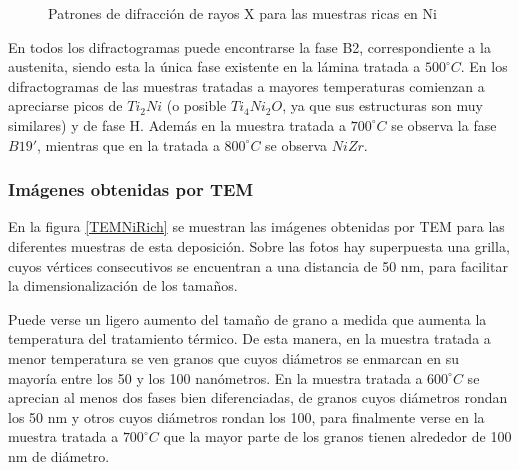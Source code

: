 \documentclass[12pt]{article}
\theoremstyle{definition}
\theoremstyle{remark}
\begin{document}
{\begin{figure}[H]
\caption{Patrones de difracción de rayos X para las muestras ricas en Ni}
\label{RXNiRich}
\end{figure}

En todos los difractogramas puede encontrarse la fase B2, correspondiente a la austenita, siendo esta la única fase existente en la lámina tratada a $500 ^\circ C$. En los difractogramas de las muestras tratadas a mayores temperaturas comienzan a apreciarse picos de $Ti_2Ni$ (o posible $Ti_4Ni_2O$, ya que sus estructuras son muy similares) y de fase H. Además en la muestra tratada a $700 ^\circ C$ se observa la fase $B19'$, mientras que en la tratada a $800 ^\circ C$ se observa $NiZr$.

\subsubsection{Imágenes obtenidas por TEM}

En la figura \ref{TEMNiRich} se muestran las imágenes obtenidas por TEM para las diferentes muestras de esta deposición. Sobre las fotos hay superpuesta una grilla, cuyos vértices consecutivos se encuentran a una distancia de 50 nm, para facilitar la dimensionalización de los tamaños. 

Puede verse un ligero aumento del tamaño de grano a medida que aumenta la temperatura del tratamiento térmico. De esta manera, en la muestra tratada a menor temperatura se ven granos que cuyos diámetros se enmarcan en su mayoría entre los 50 y los 100 nanómetros. En la muestra tratada a $600 ^\circ C$ se aprecian al menos dos fases bien diferenciadas, de granos cuyos diámetros rondan los 50 nm y otros cuyos diámetros rondan los 100, para finalmente verse en la muestra tratada a $700 ^\circ C$ que la mayor parte de los granos tienen alrededor de 100 nm de diámetro. 

}
\end{document}
